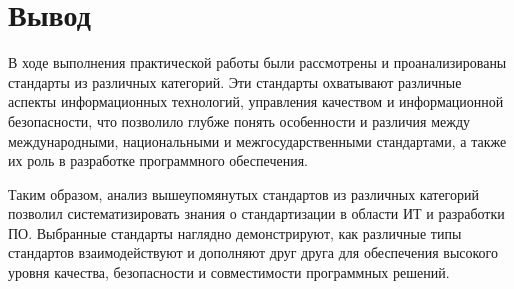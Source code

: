 \clearpage

\section*{\LARGE Вывод}

В ходе выполнения практической работы были рассмотрены
и проанализированы стандарты из различных категорий.
Эти стандарты охватывают различные аспекты информационных технологий,
управления качеством и информационной безопасности,
что позволило глубже понять особенности и различия между международными,
национальными и межгосударственными стандартами,
а также их роль в разработке программного обеспечения.

Таким образом, анализ вышеупомянутых стандартов
из различных категорий позволил систематизировать знания о стандартизации
в области ИТ и разработки ПО. Выбранные стандарты наглядно демонстрируют,
как различные типы стандартов взаимодействуют
и дополняют друг друга для обеспечения высокого уровня качества,
безопасности и совместимости программных решений.
